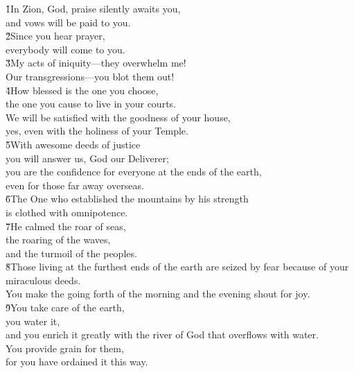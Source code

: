 \begin{poetry}
\poeml \v{1}In Zion, God, praise silently awaits you, \\
\poemll    and vows will be paid to you. \\
\poeml \v{2}Since you hear prayer, \\
\poemll    everybody will come to you. \\
\poeml \v{3}My acts of iniquity---they overwhelm me! \\
\poemll    Our transgressions---you blot them out! \\
\poeml \v{4}How blessed is the one you choose, \\
\poemll    the one you cause to live in your courts. \\
\poeml We will be satisfied with the goodness of your house, \\
\poemll    yes, even with the holiness of your Temple. \\
\poeml \v{5}With awesome deeds of justice \\
\poemll    you will answer us, God our Deliverer; \\
\poeml you are the confidence for everyone at the ends of the earth, \\
\poemll    even for those far away overseas. \\
\poeml \v{6}The One who established the mountains by his strength \\
\poemll    is clothed with omnipotence. \\
\poeml \v{7}He calmed the roar of seas, \\
\poemll    the roaring of the waves, \\
\poemlll       and the turmoil of the peoples. \\
\poeml \v{8}Those living at the furthest ends of the earth are seized by fear because of your miraculous deeds. \\
\poeml You make the going forth of the morning and the evening shout for joy. \\
\poeml \v{9}You take care of the earth, \\
\poemll    you water it, \\
\poemlll       and you enrich it greatly with the river of God that overflows with water. \\
\poeml You provide grain for them, \\
\poemll    for you have ordained it this way. \\

\end{poetry}
